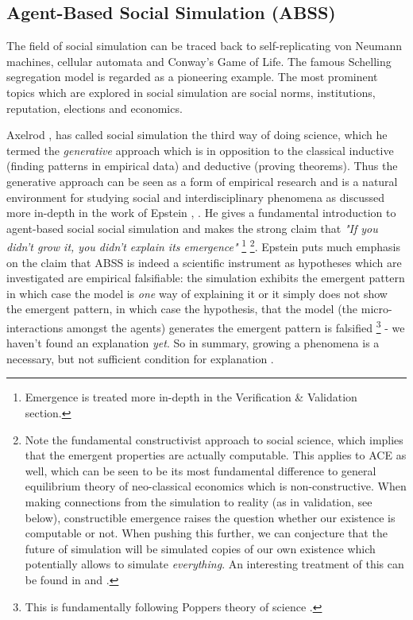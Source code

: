 \subsection{Agent-Based Social Simulation (ABSS)}
The field of social simulation can be traced back to self-replicating von Neumann machines, cellular automata and Conway's Game of Life. The famous Schelling segregation model \cite{schelling_dynamic_1971} is regarded as a pioneering example. The most prominent topics which are explored in social simulation are social norms, institutions, reputation, elections and economics.

Axelrod \cite{axelrod_advancing_1997}, \cite{axelrod_guide_2006} has called social simulation the third way of doing science, which he termed the \textit{generative} approach which is in opposition to the classical inductive (finding patterns in empirical data) and deductive (proving theorems). Thus the generative approach can be seen as a form of empirical research and is a natural environment for studying social and interdisciplinary phenomena as discussed more in-depth in the work of Epstein \cite{epstein_chapter_2006}, \cite{epstein_generative_2012}. He gives a fundamental introduction to agent-based social social simulation and makes the strong claim that \textit{"If you didn't grow it, you didn't explain its emergence"} \footnote{Emergence is treated more in-depth in the Verification \& Validation section.} \footnote{Note the fundamental constructivist approach to social science, which implies that the emergent properties are actually computable. This applies to ACE as well, which can be seen to be its most fundamental difference to general equilibrium theory of neo-classical economics which is non-constructive. When making connections from the simulation to reality (as in validation, see below), constructible emergence raises the question whether our existence is computable or not. When pushing this further, we can conjecture that the future of simulation will be simulated copies of our own existence which potentially allows to simulate \textit{everything}. An interesting treatment of this can be found in \cite{bostrom_are_2003} and \cite{steinhart_theological_2010}.}. Epstein puts much emphasis on the claim that ABSS is indeed a scientific instrument as hypotheses which are investigated are empirical falsifiable: the simulation exhibits the emergent pattern in which case the model is \textit{one} way of explaining it or it simply does not show the emergent pattern, in which case the hypothesis, that the model (the micro-interactions amongst the agents) generates the emergent pattern is falsified \footnote{This is fundamentally following Poppers theory of science \cite{popper_logic_2002}.} - we haven't found an explanation \textit{yet}. So in summary, growing a phenomena is a necessary, but not sufficient condition for explanation \cite{epstein_chapter_2006}.


